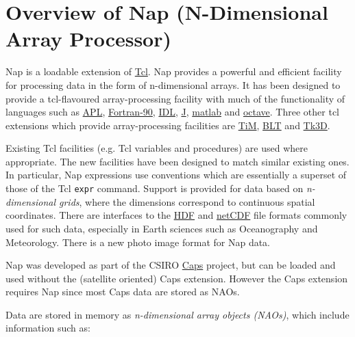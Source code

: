 
\section{Overview of Nap (N-Dimensional Array Processor)}
\label{overview}

  \par Nap is a loadable extension of 
  \href{http://wiki.tcl.tk/}{Tcl}. Nap provides a powerful and
  efficient facility for processing data in the form of n-dimensional
  arrays. It has been designed to provide a tcl-flavoured
  array-processing facility with much of the functionality of languages
  such as 
  \href{http://www.acm.org/sigapl/}{APL}, 
  \href{http://www.fortran.com/fortran/}{Fortran-90}, 
  \href{http://www.rsinc.com/idl/index.asp}{IDL}, 
  \href{http://www.jsoftware.com/}{J}, 
  \href{http://www.mathworks.com/}{matlab} and 
  \href{http://www.octave.org/}{octave}. Three other tcl
  extensions which provide array-processing facilities are 
  \href{http://www-obs.univ-lyon1.fr/\%7Ethiebaut/TiM/TiM.html}{TiM},
  \href{http://sourceforge.net/projects/blt/}{BLT} and 
  \href{http://www.gm.com/automotive/innovations/rnd/TK3/TK3D-Software-Description.html}{ Tk3D}.
  \par Existing Tcl facilities (e.g. Tcl variables and procedures) are
  used where appropriate. The new facilities have been designed to
  match similar existing ones. In particular, Nap expressions use
  conventions which are essentially a superset of those of the Tcl 
  \texttt{expr} command. Support is provided for data based on 
  \emph{n-dimensional grids}, where the dimensions correspond to
  continuous spatial coordinates. There are interfaces to the 
  \href{http://www.hdfgroup.org/}{HDF} and 
  \href{http://www.unidata.ucar.edu/packages/netcdf/index.html}{netCDF}
  file formats commonly used for such data, especially in Earth
  sciences such as Oceanography and Meteorology. There is a new photo
  image format for Nap data.
  \par Nap was developed as part of the CSIRO 
\href{http://www.eoc.csiro.au/cats/caps/}{Caps}
  project, but can be loaded and used without the (satellite oriented)
  Caps extension. However the Caps extension requires Nap since most
  Caps data are stored as NAOs.
  \par Data are stored in memory as 
  \emph{n-dimensional array objects (NAOs)}, which include
  information such as:
